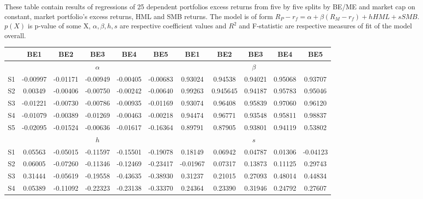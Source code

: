 \documentclass[a4paper,12pt]{article} %
\begin{document}
	\begin{landscape}
		\linespread{1}
		\begin{table}
			\tabcolsep=0.07cm
			\caption{\label{tab:Table1}Regression parameters of $5\times 5$ dependent return portfolio splits}
			\footnotesize
			These table contain results of regressions of 25 dependent portfolios excess returns from five by five splits by BE/ME and market cap on constant, market portfolio's excess returns, HML and SMB returns. The model is of form $R_P - r_f = \alpha + \beta (R_M - r_f) + hHML + sSMB$. $p(X)$ is p-value of some X, $\alpha, \beta, h, s$ are respective coefficient values and $R^2$ and F-statistic are respective measures of fit of the model overall.
			\newline
			\small
			\begin{longtable}{c|ccccc|ccccc|} 
				& BE1 & BE2& BE3& BE4&BE5& BE1 & BE2& BE3& BE4&BE5\\
				\hline
				& \multicolumn{5}{c|}{$\alpha$} & \multicolumn{5}{c|}{$\beta$}\\
				\hline
				S1 & -0.00997 &  -0.01171 & -0.00949 & -0.00405 & -0.00683 &  0.93024 &  0.94538 &  0.94021 &  0.95068 &  0.93707\\
				S2 &  0.00349 & -0.00406 & -0.00750 & -0.00242 & -0.00640 &  0.99263 &  0.945645 &  0.94187 &  0.95783 &  0.95046\\
				S3& -0.01221 & -0.00730 & -0.00786 & -0.00935 &   -0.01169 &  0.93074 &  0.96408 &  0.95839 &  0.97060 &  0.96120\\
				S4& -0.01079 & -0.00389 &  -0.01269 & -0.00463 & -0.00218 &  0.94474 &  0.96771 &   0.93548 &  0.95811 &  0.98837\\
				S5& -0.02095 &  -0.01524 &  -0.00636 &  -0.01617 &   -0.16364 &   0.89791 &  0.87905 &  0.93801 &  0.94119 &  0.53802
				\vspace{0.3cm}\\
				& \multicolumn{5}{c|}{$h$} & \multicolumn{5}{c|}{$s$}\\
				\hline
				S1& 0.05563 & -0.05015 & -0.11597 &  -0.15501 & -0.19078 &   0.18149 &  0.06942 &  0.04787 &  0.01306 & -0.04123\\
				S2& 0.06005 &  -0.07260 & -0.11346 &  -0.12469 & -0.23417 & -0.01967 &  0.07317 &  0.13873 &   0.11125 &   0.29743\\
				S3& 0.31444 & -0.05619 & -0.19558 &  -0.43635 & -0.38930 &   0.31237 &   0.21015 &  0.27093 &   0.48014 &   0.44834\\
				S4& 0.05389 &  -0.11092 &  -0.22323 &  -0.23138 & -0.33370 &   0.24364 &   0.23390 &  0.31946 &   0.24792 &   0.27607\\

\end{longtable}
\end{table}
\end{landscape}
\end{document}
